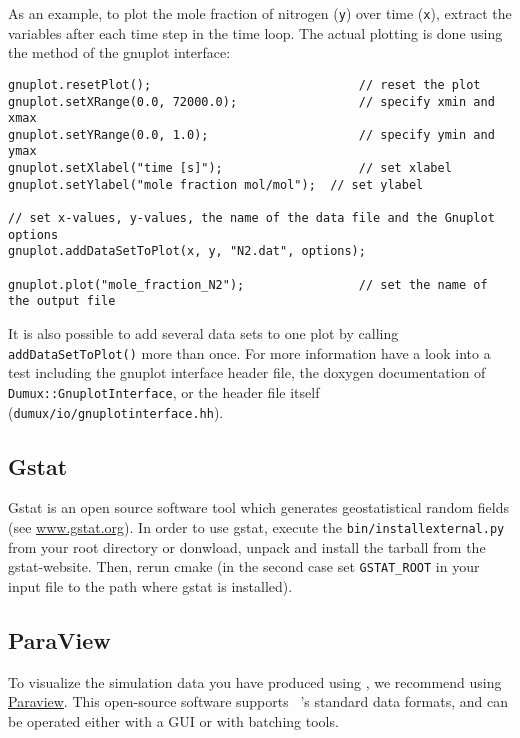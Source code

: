 As an example, to plot the mole fraction of nitrogen (\texttt{y}) over time (\texttt{x}),
extract the variables after each time step in the time loop.
The actual plotting is done using the method of the gnuplot interface:

\begin{lstlisting}[style=DumuxCode]
gnuplot.resetPlot();                             // reset the plot
gnuplot.setXRange(0.0, 72000.0);                 // specify xmin and xmax
gnuplot.setYRange(0.0, 1.0);                     // specify ymin and ymax
gnuplot.setXlabel("time [s]");                   // set xlabel
gnuplot.setYlabel("mole fraction mol/mol");  // set ylabel

// set x-values, y-values, the name of the data file and the Gnuplot options
gnuplot.addDataSetToPlot(x, y, "N2.dat", options);

gnuplot.plot("mole_fraction_N2");                // set the name of the output file
\end{lstlisting}

It is also possible to add several data sets to one plot by calling \texttt{addDataSetToPlot()} more than once.
For more information have a look into a test including the gnuplot interface header file, the doxygen documentation
of \texttt{Dumux::GnuplotInterface}, or the header file itself (\texttt{dumux/io/gnuplotinterface.hh}).


\subsection{Gstat}
Gstat is an open source software tool which generates geostatistical random fields (see \url{www.gstat.org}).
In order to use gstat, execute the \texttt{bin/installexternal.py} from your \Dumux root
directory or donwload, unpack and install the tarball from the gstat-website.
Then, rerun cmake (in the second case set \texttt{GSTAT\_ROOT} in your input file to the
path where gstat is installed).


\subsection{ParaView} \label{ssec:paraview}
To visualize the simulation data you have produced using \Dumux, we recommend using \href{https://www.paraview.org/}{Paraview}. 
This open-source software supports \Dumux~'s standard data formats, and can be operated either with a GUI or with batching tools. 